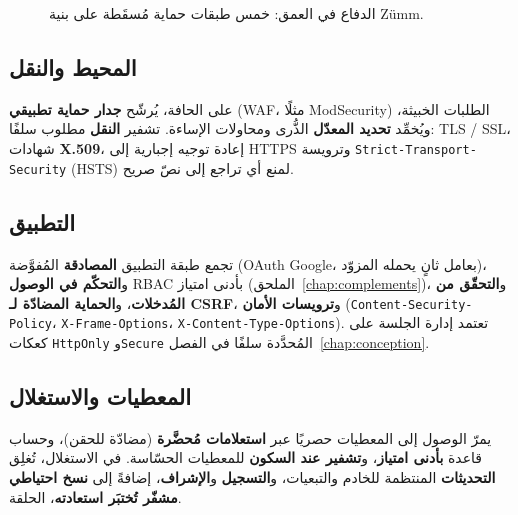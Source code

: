 \begin{figure}[htbp]
\centering
{}
\caption{الدفاع في العمق: خمس طبقات حماية مُسقَطة على بنية Zümm.}
\label{fig:secu-couches}
\end{figure}

\subsection{المحيط والنقل}
على الحافة، يُرشّح \textbf{جدار حماية تطبيقي} (WAF، مثلًا ModSecurity) الطلبات
الخبيثة، ويُخمِّد \textbf{تحديد المعدّل} الذُّرى ومحاولات الإساءة. تشفير
\textbf{النقل} مطلوب سلفًا: TLS / SSL، شهادات \textbf{X.509}، إعادة توجيه إجبارية
إلى HTTPS وترويسة \texttt{Strict-Transport-Security} (HSTS) لمنع أي تراجع إلى
نصّ صريح.

\subsection{التطبيق}
تجمع طبقة التطبيق \textbf{المصادقة} المُفوَّضة (OAuth Google، بعامل ثانٍ يحمله
المزوّد)، و\textbf{التحكّم في الوصول} RBAC بأدنى امتياز
(الملحق~\ref{chap:complements})، و\textbf{التحقّق من المُدخلات}، و\textbf{الحماية
المضادّة لـ CSRF}، و\textbf{ترويسات الأمان} (\texttt{Content-Security-Policy}،
\texttt{X-Frame-Options}، \texttt{X-Content-Type-Options}). تعتمد إدارة الجلسة
على كعكات \texttt{HttpOnly} و\texttt{Secure} المُحدَّدة سلفًا في
الفصل~\ref{chap:conception}.

\subsection{المعطيات والاستغلال}
يمرّ الوصول إلى المعطيات حصريًا عبر \textbf{استعلامات مُحضَّرة} (مضادّة للحقن)،
وحساب قاعدة \textbf{بأدنى امتياز}، و\textbf{تشفير عند السكون} للمعطيات الحسّاسة.
في الاستغلال، تُغلِق \textbf{التحديثات} المنتظمة للخادم والتبعيات،
و\textbf{التسجيل} و\textbf{الإشراف}، إضافةً إلى \textbf{نسخ احتياطي مشفّر تُختبَر
استعادته}، الحلقة.

